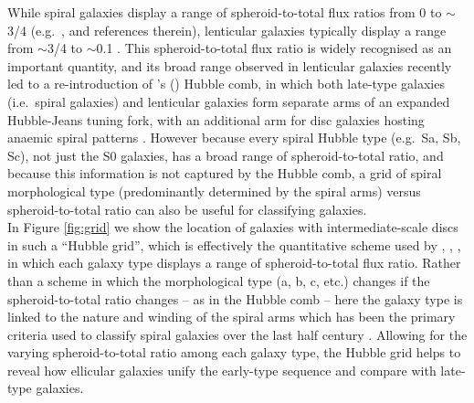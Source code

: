 \documentclass[useAMS,usenatbib,article]{mnras}
\begin{document}
  While spiral galaxies display a range of spheroid-to-total flux ratios
  from 0 to $\sim$3/4 (e.g.~\citealt{grahamworley2008}, and references
  therein), lenticular galaxies typically display a range from
  $\sim$3/4 to $\sim$0.1 \citep{laurikainen2010}.  This spheroid-to-total flux
  ratio is widely recognised as an important quantity, and its broad range observed in
  lenticular galaxies recently led to a re-introduction of 
  \citeauthor{vandenbergh1976}'s (\citeyear{vandenbergh1976})
  Hubble comb, in which both late-type galaxies (i.e.~spiral galaxies)
  and lenticular galaxies form separate arms of an expanded Hubble-Jeans tuning
  fork, with an additional arm for disc galaxies hosting anaemic spiral
  patterns \citep{cappellari2011kmdr,kormendybender2012}.  
  However because every spiral Hubble type (e.g.~Sa, Sb, Sc), not just the S0 galaxies, 
  has a broad range of spheroid-to-total ratio, and because this information is not captured by the Hubble comb, 
  a grid of spiral morphological type (predominantly determined by the spiral
  arms) versus spheroid-to-total ratio can also be useful for classifying galaxies.  \\
  In Figure \ref{fig:grid} we show the location of galaxies with intermediate-scale
  discs in such a ``Hubble grid'', which is effectively the quantitative scheme used by  
  \cite{boroson1981}, \cite{kent1985}, \cite{kodaira1986}, \cite{simiendevaucouleurs1986} 
  in which each galaxy type displays a range of spheroid-to-total flux ratio.
  Rather than a scheme in which the morphological type (a, b, c,
  etc.) changes if the spheroid-to-total ratio changes -- as in the Hubble comb -- here
  the galaxy type is linked to the nature and winding of the spiral arms
  which has been the primary criteria used to classify spiral galaxies
  over the last half century \citep{sandage1961}.  
  Allowing for the varying spheroid-to-total ratio among each galaxy type, 
  the Hubble grid helps to reveal how ellicular galaxies unify the early-type sequence and compare with late-type galaxies. 
\end{document}
